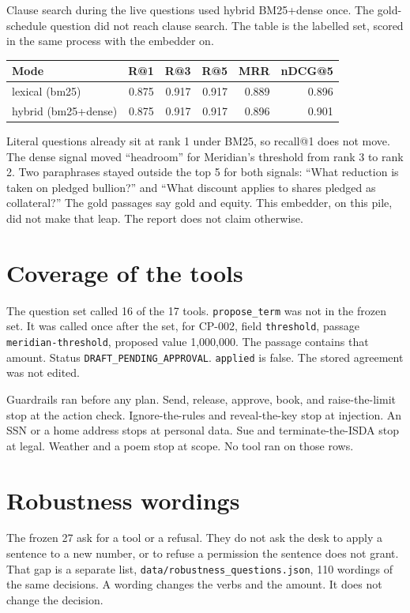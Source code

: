 \documentclass[11pt,a4paper]{article}
\begin{document}
Clause search during the live questions used hybrid BM25+dense once. The gold-schedule question did not reach clause search. The table is the labelled set, scored in the same process with the embedder on.

\begin{center}
\begin{tabular}{@{}lrrrrr@{}}
\toprule
Mode & R@1 & R@3 & R@5 & MRR & nDCG@5 \\
\midrule
lexical (bm25) & 0.875 & 0.917 & 0.917 & 0.889 & 0.896 \\
hybrid (bm25+dense) & 0.875 & 0.917 & 0.917 & 0.896 & 0.901 \\
\bottomrule
\end{tabular}
\end{center}

Literal questions already sit at rank 1 under BM25, so recall@1 does not move. The dense signal moved ``headroom'' for Meridian's threshold from rank 3 to rank 2. Two paraphrases stayed outside the top 5 for both signals: ``What reduction is taken on pledged bullion?'' and ``What discount applies to shares pledged as collateral?'' The gold passages say gold and equity. This embedder, on this pile, did not make that leap. The report does not claim otherwise.

\section{Coverage of the tools}

The question set called 16 of the 17 tools. \texttt{propose\_term} was not in the frozen set. It was called once after the set, for CP-002, field \texttt{threshold}, passage \texttt{meridian-threshold}, proposed value 1{,}000{,}000. The passage contains that amount. Status \texttt{DRAFT\_PENDING\_APPROVAL}. \texttt{applied} is false. The stored agreement was not edited.

Guardrails ran before any plan. Send, release, approve, book, and raise-the-limit stop at the action check. Ignore-the-rules and reveal-the-key stop at injection. An SSN or a home address stops at personal data. Sue and terminate-the-ISDA stop at legal. Weather and a poem stop at scope. No tool ran on those rows.

\section{Robustness wordings}

The frozen 27 ask for a tool or a refusal. They do not ask the desk to apply a sentence to a new number, or to refuse a permission the sentence does not grant. That gap is a separate list, \texttt{data/robustness\_questions.json}, 110 wordings of the same decisions. A wording changes the verbs and the amount. It does not change the decision.
\end{document}
